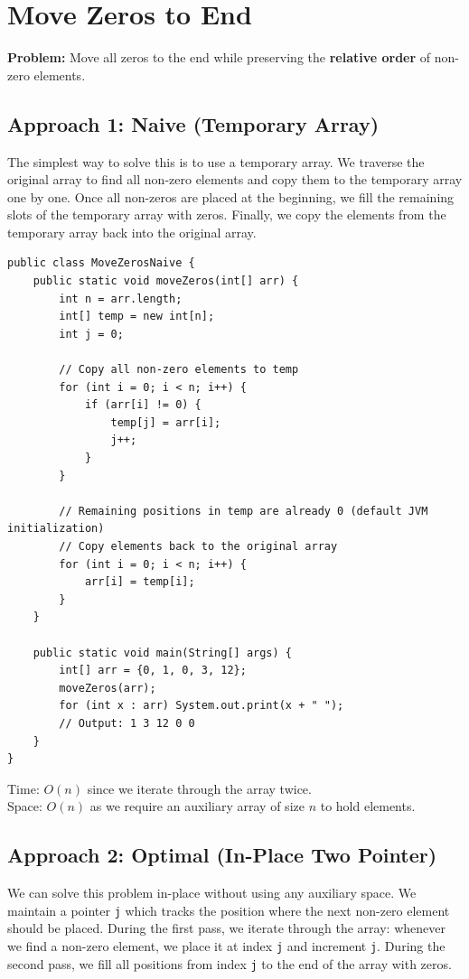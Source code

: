\documentclass[12pt,a4paper,oneside]{book}
\begin{document}
\section{Move Zeros to End}

\textbf{Problem:} Move all zeros to the end while preserving the \textbf{relative order} of non-zero elements.

\subsection{Approach 1: Naive (Temporary Array)}
The simplest way to solve this is to use a temporary array. We traverse the original array to find all non-zero elements and copy them to the temporary array one by one. Once all non-zeros are placed at the beginning, we fill the remaining slots of the temporary array with zeros. Finally, we copy the elements from the temporary array back into the original array.

\begin{lstlisting}[caption={Move Zeros to End --- Naive approach using Temporary Array, O(n) time O(n) space}]
public class MoveZerosNaive {
    public static void moveZeros(int[] arr) {
        int n = arr.length;
        int[] temp = new int[n];
        int j = 0;

        // Copy all non-zero elements to temp
        for (int i = 0; i < n; i++) {
            if (arr[i] != 0) {
                temp[j] = arr[i];
                j++;
            }
        }

        // Remaining positions in temp are already 0 (default JVM initialization)
        // Copy elements back to the original array
        for (int i = 0; i < n; i++) {
            arr[i] = temp[i];
        }
    }

    public static void main(String[] args) {
        int[] arr = {0, 1, 0, 3, 12};
        moveZeros(arr);
        for (int x : arr) System.out.print(x + " ");
        // Output: 1 3 12 0 0
    }
}
\end{lstlisting}

\begin{complexity}
Time: $O(n)$ since we iterate through the array twice.\\
Space: $O(n)$ as we require an auxiliary array of size $n$ to hold elements.
\end{complexity}

\subsection{Approach 2: Optimal (In-Place Two Pointer)}
We can solve this problem in-place without using any auxiliary space. We maintain a pointer \texttt{j} which tracks the position where the next non-zero element should be placed. During the first pass, we iterate through the array: whenever we find a non-zero element, we place it at index \texttt{j} and increment \texttt{j}. During the second pass, we fill all positions from index \texttt{j} to the end of the array with zeros.
\end{document}
